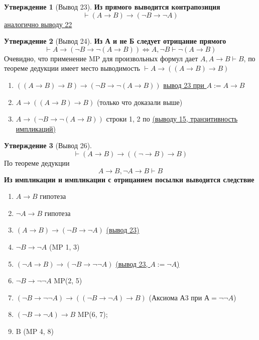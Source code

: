 \documentclass[a4paper]{article}
\theoremstyle{definition}
\newtheorem*{statement}{Утверждение}
\theoremstyle{remark}
\begin{document}
    \begin{statement}[\hypertarget{Вывод 23}{Вывод 23}] 
        \textbf{Из прямого выводится контрапозиция}
        $$\vdash (A \to B) \to (\neg B\to \neg A)$$
        \hyperlink{Вывод 22}{аналогично выводу 22}
    \end{statement}  
    \begin{statement}[\hypertarget{Вывод 24}{Вывод 24}] 
        \textbf{Из А и не Б следует отрицание прямого}
        $$\vdash A\to (\neg B \to \neg (A\to B)) \Leftrightarrow A, \neg B \vdash \neg (A \to B)$$
        Очевидно, что применение MP для произвольных формул дает $A, A \to B \vdash B$, по теореме дедукции имеет место выводимость
        $\vdash A \to ((A \to B) \to B)$
        \begin{enumerate}
            \item $((A\to B)\to B)\to (\neg B \to \neg (A\to B))$  \hyperlink{Вывод 23}{вывод 23 при $A:= A\to B$}
            \item $A\to ((A\to B) \to B)$ (только что доказали выше)
            \item $A\to (\neg B \to \neg (A\to B))$ строки 1, 2 по \hyperlink{Вывод 15}{(выводу 15, транзитивность импликаций)}
        \end{enumerate}
    \end{statement}
    \begin{statement}[Вывод 26]
        $$\vdash (A\to B)\to ((\neg \to B) \to B)$$
        По теореме дедукции
        $$A\to B, \neg A \to B \vdash B$$
        \textbf{Из импликации и импликации с отрицанием посылки выводится следствие}
        \begin{enumerate}
            \item $A\to B$ гипотеза
            \item $\neg A\to B$ гипотеза
            \item $(A\to B) \to (\neg B \to \neg A)$ \hyperlink{Вывод 23}{(вывод 23)}
            \item $\neg B \to \neg A$ (MP 1, 3)
            \item $(\neg A \to B)\to (\neg B \to \neg \neg A)$ \hyperlink{Вывод 23}{(вывод 23, $A := \neg A$)}
            \item $\neg B \to \neg \neg A$ MP(2, 5)
            \item $(\neg B \to \neg\neg A) \to ((\neg B \to \neg A) \to B)$ (Аксиома А3 при $А = \neg \neg A$)
            \item $(\neg B \to \neg A) \to B$ MP(6, 7);
            \item B (MP 4, 8)
        \end{enumerate}
    \end{statement}
\end{document}
